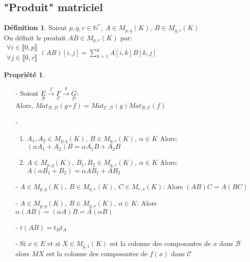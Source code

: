 \documentclass[fleqn]{article}
\theoremstyle{definition} \newtheorem*{defi}{D\'efinition}
\theoremstyle{definition} \newtheorem*{theo}{Th\'eor\`eme}
\theoremstyle{definition} \newtheorem*{coro}{Corollaire}
\theoremstyle{definition} \newtheorem*{nota}{Notation}
\theoremstyle{definition} \newtheorem*{vocab}{Vocabulaire}
\theoremstyle{remark} \newtheorem*{rqs}{Remarques}
\theoremstyle{definition} \newtheorem*{prop}{Propri\'et\'e}
\begin{document}
\subsection{"Produit" matriciel}
\begin{defi} Soient $p,q,r \in \mathbb{N}^*,\ A \in M_{p,q}(K),\ B \in M_{q,r}(K)$ \\
	On d\'efinit le produit $AB \in M_{p,r}(K)$ par: \\
	$\left. \begin{array}{l}
		\forall i \in  \llbracket 0,p \rrbracket  \\
		\forall j \in  \llbracket 0,r \rrbracket
	\end{array}\right. (AB)[i,j] = \sum_{k=1}^q A[i,k]B[k,j]$
\end{defi}

\begin{prop} $ $
	\begin{enumerate}
		\item [-] Soient $\underset{\mathscr{B}}{E} \overset{f}{\rightarrow} \underset{\mathscr{C}}{F} \overset{g}{\rightarrow}
			\underset{\mathscr{D}}{G}$: \\
			Alors, $Mat_{\mathscr{B},\mathscr{D}}(g\circ f) = Mat_{\mathscr{C},\mathscr{D}}(g) Mat_{\mathscr{B},\mathscr{C}}(f)$
		\item [-]
			\begin{enumerate}
				\item $A_1, A_2 \in M_{p,q}(K),\ B \in M_{q,r}(K),\ \alpha \in K$ Alors:\\ $(\alpha A_1 + A_2)B = \alpha A_1 B + A_2 B$
				\item $A \in M_{p,q}(K),\ B_1, B_2 \in M_{q,r}(K),\ \alpha \in K$ Alors:\\ $A(\alpha B_1 + B_2) = \alpha A B_1 + A B_2$
			\end{enumerate}
		\item [-] $A \in M_{p,q}(K),\ B \in M_{q,r}(K),\ C \in M_{r,s}(K)$: Alors $(AB)C = A(BC)$
		\item [-] $A \in M_{p,q}(K),\ B \in M_{q,r}(K),\ \alpha \in K$: Alors $\alpha (AB) = (\alpha A)B = A (\alpha B)$
		\item [-] $t(AB) = t_B t_A$
		\item [-] Si $x \in E$ et si $X \in M_{q,1}(K)$ est la colonne des composantes de $x$ dans $\mathscr{B}$ alors $MX$ est la colonne des
			composantes de $f(x)$ dans $\mathscr{C}$
	\end{enumerate}
\end{prop}
\end{document}
